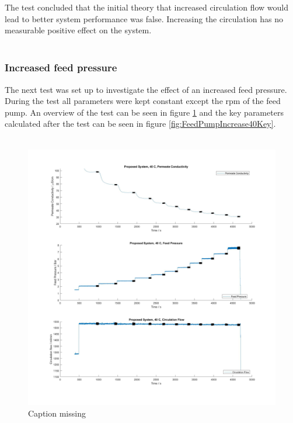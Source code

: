 \par\bigskip 
\noindent
The test concluded that the initial theory that increased circulation flow would lead to better system performance was false. Increasing the circulation has no measurable positive effect on the system. \\
\\
\newpage
\subsubsection{Increased feed pressure}
The next test was set up to investigate the effect of an increased feed pressure. During the test all parameters were kept constant except the rpm of the feed pump. An overview of the test can be seen in figure \ref{fig:FeedPumpIncrease40} and the key parameters calculated after the test can be seen in figure \ref{fig:FeedPumpIncrease40Key}.\\
\\
\begin{figure}[H]
    \centering
    \includegraphics[width=1.1\textwidth]{FeedPumpIncrease40}
    \caption{Caption missing}
    \label{fig:FeedPumpIncrease40}
\end{figure}

